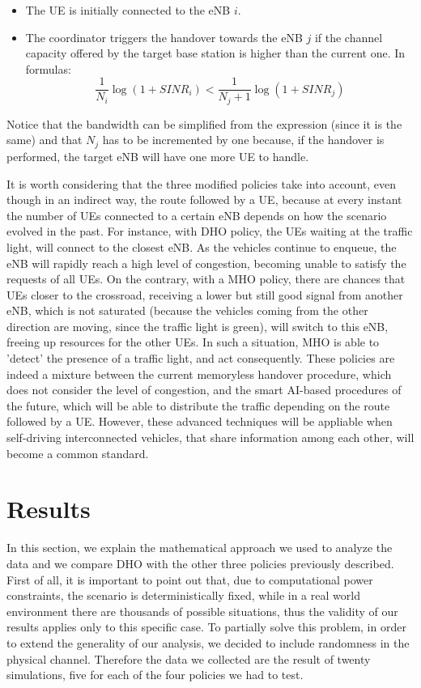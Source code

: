 \documentclass[conference,10pt]{IEEEtran}
\begin{document}
\begin{enumerate}
\begin{itemize}
	\item The UE is initially connected to the eNB $i$.
	\item The coordinator triggers the handover towards the eNB $j$ if the channel capacity offered by the target base station is higher than the current one. In formulas:
	$$
	\frac{1}{N_i} \log(1+SINR_i) < \frac{1}{N_j+1} \log(1+SINR_j)
	$$ 
\end{itemize}
\noindent Notice that the bandwidth can be simplified from the expression (since it is the same) and that $N_j$ has to be incremented by one because, if the handover is performed, the target eNB will have one more UE to handle.
\end{enumerate}

It is worth considering that the three modified policies take into account, even though in an indirect way, the route followed by a UE, because at every instant the number of UEs connected to a certain eNB depends on how the scenario evolved in the past. For instance, with DHO policy, the UEs waiting at the traffic light, will connect to the closest eNB. As the vehicles continue to enqueue, the eNB will rapidly reach a high level of congestion, becoming unable to satisfy the requests of all UEs. On the contrary, with a MHO policy, there are chances that UEs closer to the crossroad, receiving a lower but still good signal from another eNB, which is not saturated (because the vehicles coming from the other direction are moving, since the traffic light is green), will switch to this eNB, freeing up resources for the other UEs. In such a situation, MHO is able to 'detect' the presence of a traffic light, and act consequently. These policies are indeed a mixture between the current memoryless handover procedure, which does not consider the level of congestion, and the smart AI-based procedures of the future, which will be able to distribute the traffic depending on the route followed by a UE. However, these advanced techniques will be appliable when self-driving interconnected vehicles, that share information among each other, will become a common standard.

\section{Results}\label{sec:res}

In this section, we explain the mathematical approach we used to analyze the data and we compare DHO with the other three policies previously described.
First of all, it is important to point out that, due to computational power constraints, the scenario is deterministically fixed, while in a real world environment there are thousands of possible situations, thus the validity of our results applies only to this specific case. To partially solve this problem, in order to extend the generality of our analysis, we decided to include randomness in the physical channel. Therefore the data we collected are the result of twenty simulations, five for each of the four policies we had to test.
\end{document}
